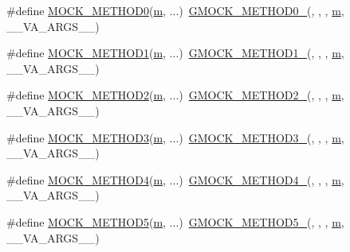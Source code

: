 \begin{DoxyCompactItemize}
\item 
\#define \hyperlink{gmock-generated-function-mockers_8h_a411c69e9d489d590480f728d365ae450}{M\+O\+C\+K\+\_\+\+M\+E\+T\+H\+O\+D0}(\hyperlink{app_2main_8cpp_a0d2d8836216fc94b61aa0824eb239db2}{m}, ...)~\hyperlink{gmock-generated-function-mockers_8h_ae0d290ffa58d7c624b2e3487ba1252f4}{G\+M\+O\+C\+K\+\_\+\+M\+E\+T\+H\+O\+D0\+\_\+}(, , , \hyperlink{app_2main_8cpp_a0d2d8836216fc94b61aa0824eb239db2}{m}, \+\_\+\+\_\+\+V\+A\+\_\+\+A\+R\+G\+S\+\_\+\+\_\+)
\item 
\#define \hyperlink{gmock-generated-function-mockers_8h_ac49d366be035ee87b73264a29059cdc7}{M\+O\+C\+K\+\_\+\+M\+E\+T\+H\+O\+D1}(\hyperlink{app_2main_8cpp_a0d2d8836216fc94b61aa0824eb239db2}{m}, ...)~\hyperlink{gmock-generated-function-mockers_8h_a1bc0012d62440dda77208dabdf4925c9}{G\+M\+O\+C\+K\+\_\+\+M\+E\+T\+H\+O\+D1\+\_\+}(, , , \hyperlink{app_2main_8cpp_a0d2d8836216fc94b61aa0824eb239db2}{m}, \+\_\+\+\_\+\+V\+A\+\_\+\+A\+R\+G\+S\+\_\+\+\_\+)
\item 
\#define \hyperlink{gmock-generated-function-mockers_8h_ab3fb7d97f21dc99205db38a14df4a1c4}{M\+O\+C\+K\+\_\+\+M\+E\+T\+H\+O\+D2}(\hyperlink{app_2main_8cpp_a0d2d8836216fc94b61aa0824eb239db2}{m}, ...)~\hyperlink{gmock-generated-function-mockers_8h_a885295ca6bebb15efb3fc786218c5d47}{G\+M\+O\+C\+K\+\_\+\+M\+E\+T\+H\+O\+D2\+\_\+}(, , , \hyperlink{app_2main_8cpp_a0d2d8836216fc94b61aa0824eb239db2}{m}, \+\_\+\+\_\+\+V\+A\+\_\+\+A\+R\+G\+S\+\_\+\+\_\+)
\item 
\#define \hyperlink{gmock-generated-function-mockers_8h_af11ebf7fafb231778846dba77725cfdd}{M\+O\+C\+K\+\_\+\+M\+E\+T\+H\+O\+D3}(\hyperlink{app_2main_8cpp_a0d2d8836216fc94b61aa0824eb239db2}{m}, ...)~\hyperlink{gmock-generated-function-mockers_8h_af7c77ba511c631de02bb8c45a6ed3045}{G\+M\+O\+C\+K\+\_\+\+M\+E\+T\+H\+O\+D3\+\_\+}(, , , \hyperlink{app_2main_8cpp_a0d2d8836216fc94b61aa0824eb239db2}{m}, \+\_\+\+\_\+\+V\+A\+\_\+\+A\+R\+G\+S\+\_\+\+\_\+)
\item 
\#define \hyperlink{gmock-generated-function-mockers_8h_a111d70ee62b09089ec3cd7d6662e5cd2}{M\+O\+C\+K\+\_\+\+M\+E\+T\+H\+O\+D4}(\hyperlink{app_2main_8cpp_a0d2d8836216fc94b61aa0824eb239db2}{m}, ...)~\hyperlink{gmock-generated-function-mockers_8h_ab6430f2cfad9de4aca5258ea559294bb}{G\+M\+O\+C\+K\+\_\+\+M\+E\+T\+H\+O\+D4\+\_\+}(, , , \hyperlink{app_2main_8cpp_a0d2d8836216fc94b61aa0824eb239db2}{m}, \+\_\+\+\_\+\+V\+A\+\_\+\+A\+R\+G\+S\+\_\+\+\_\+)
\item 
\#define \hyperlink{gmock-generated-function-mockers_8h_a9b83bed95e89664e61d3a36174de0052}{M\+O\+C\+K\+\_\+\+M\+E\+T\+H\+O\+D5}(\hyperlink{app_2main_8cpp_a0d2d8836216fc94b61aa0824eb239db2}{m}, ...)~\hyperlink{gmock-generated-function-mockers_8h_a9e3ecd392499ab19a4a6d3adcabf56f6}{G\+M\+O\+C\+K\+\_\+\+M\+E\+T\+H\+O\+D5\+\_\+}(, , , \hyperlink{app_2main_8cpp_a0d2d8836216fc94b61aa0824eb239db2}{m}, \+\_\+\+\_\+\+V\+A\+\_\+\+A\+R\+G\+S\+\_\+\+\_\+)

\end{DoxyCompactItemize}
